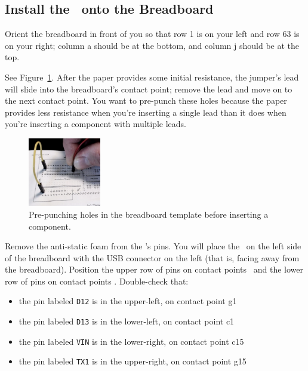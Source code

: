 \subsection{Install the \developmentboard\ onto the Breadboard}

    Orient the breadboard in front of you so that row 1 is on your left and row 63 is on your right;
    column a should be at the bottom, and column j should be at the top.

    See Figure~\ref{fig:prepunching}.
    After the paper provides some initial resistance, the jumper's lead will slide into the breadboard's contact point;
    remove the lead and move on to the next contact point.
    You want to pre-punch these holes because the paper provides less resistance when you're inserting a single lead than it does when you're inserting a component with multiple leads.

    \begin{figure}
        \centering
        \includegraphics[height=3cm]{microcontroller/breadboard/prepunching}
        \caption{Pre-punching holes in the breadboard template before inserting a component.} \label{fig:prepunching}
    \end{figure}

    Remove the anti-static foam from the \developmentboard's pins.
    You will place the \developmentboard\ on the left side of the breadboard with the USB connector on the left (that is, facing away from the breadboard).
    Position the upper row of pins on contact points \mcuupperrow\ and the lower row of pins on contact points \mculowerrow.
    Double-check that:  %
    \begin{itemize}
        \item the pin labeled \texttt{D12} is in the upper-left, on contact point g1
        \item the pin labeled \texttt{D13} is in the lower-left, on contact point c1
        \item the pin labeled \texttt{VIN} is in the lower-right, on contact point c15
        \item the pin labeled \texttt{TX1} is in the upper-right, on contact point g15
    \end{itemize}

